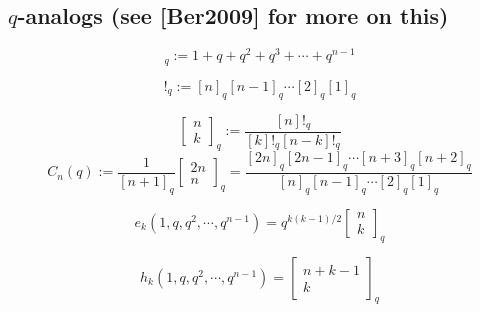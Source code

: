 \documentclass[12pt]{amsart}
\begin{document}
\begin{mdframed}[linecolor=red!20,linewidth=3pt,innertopmargin=8pt]
	\section{$q$-analogs (see [Ber2009] for more on this)}
	\begin{minipage}[t]{8.5cm}
		\begin{equation} [n]_q:=1+q+q^2+q^3+\cdots+q^{n-1}
		\end{equation}
	\end{minipage}
	\begin{minipage}[t]{8.4cm}
		\begin{equation}	[n]!_q:=[n]_q[n-1]_q\cdots[2]_q[1]_q
		\end{equation}
	\end{minipage}
	\begin{equation}
		\begin{bmatrix} n\\k \end{bmatrix}_q:=\frac{[n]!_q}{[k]!_q[n-k]!_q}
	\end{equation}
	\begin{equation}
		C_n(q):=\frac{1}{[n+1]_q}\begin{bmatrix} 2n\\n \end{bmatrix}_q=\frac{[2n]_q[2n-1]_q\cdots[n+3]_q[n+2]_q}{[n]_q[n-1]_q\cdots[2]_q[1]_q}
	\end{equation}
	\begin{minipage}[t]{8.5cm}
		\begin{equation} e_k(1,q,q^2,\cdots,q^{n-1})=q^{k(k-1)/2}\begin{bmatrix}n\\k \end{bmatrix}_q
		\end{equation}
	\end{minipage}
	\begin{minipage}[t]{8.4cm}
		\begin{equation}h_k(1,q,q^2,\cdots,q^{n-1})=\begin{bmatrix}n+k-1\\k \end{bmatrix}_q
		\end{equation}
	\end{minipage}

 \end{mdframed}
\end{document}
